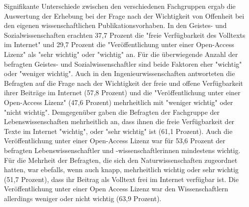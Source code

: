 Signifikante Unterschiede zwischen den verschiedenen Fachgruppen ergab die Auswertung der Erhebung bei der Frage nach der Wichtigkeit von Offenheit bei den eigenen wissenschaftlichen Publikationsvorhaben. In den Geistes- und Sozialwissenschaften erachten 37,7 Prozent die "freie Verfügbarkeit des Volltexts im Internet" und 29,7 Prozent die "Veröffentlichung unter einer Open-Access Lizenz" als "sehr wichtig" oder "wichtig" an. Für die überwiegende Anzahl der befragten Geistes- und Sozialwissenschaftler sind beide Faktoren eher "wichtig" oder "weniger wichtig". Auch in den Ingenieurwissenschaften antworteten die Befragten auf die Frage nach der Wichtigkeit der freie und offene Verfügbarkeit ihrer Beiträge im Internet (57,8 Prozent) und die "Veröffentlichung unter einer Open-Access Lizenz" (47,6 Prozent) mehrheitlich mit "weniger wichtig" oder "nicht wichtig". Demgegenüber gaben die Befragten der Fachgruppe der Lebenswissenschaften mehrheitlich an, dass ihnen die freie Verfügbarkeit der Texte im Internet "wichtig", oder "sehr wichtig" ist (61,1 Prozent). Auch die Veröffentlichung unter einer Open-Access Lizenz war für 53,6 Prozent der befragten Lebenswissenschaftler und -wissenschaftlerinnen mindestens wichtig. Für die Mehrheit der Befragten, die sich den Naturwissenschaften zugeordnet hatten, war ebefalls, wenn auch knapp, mehrheitlich wichtig oder sehr wichtig (51,7 Prozent), dass ihr Beitrag als Volltext frei im Internet verfügbar ist. Die Veröffentlichung unter einer Open Access Lizenz war den Wissenschaftlern allerdings weniger oder nicht wichtig (63,9 Prozent).

